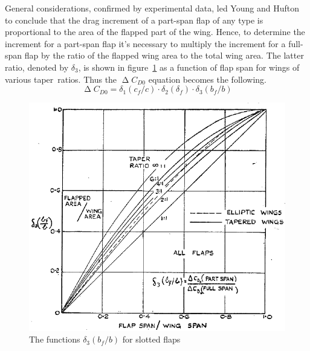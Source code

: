 \bigskip
\noindent
General considerations, confirmed by experimental data, led Young and Hufton to conclude that the drag increment of a part-span flap of any type is proportional to the area of the flapped part of the wing.
%
\noindent
Hence, to determine the increment for a part-span flap it's necessary to multiply the increment for a full-span flap by the ratio of the flapped wing area to the total wing area. The latter ratio, denoted by $\delta_3$, is shown in figure~\ref{fig:Delta3} as a function of flap span for wings of various taper~ratios. Thus the $\upDelta C_{D0}$ equation becomes the following.
%
\begin{equation}
\upDelta C_{D0}=\delta_1\left(c_f/c\right)\cdot\delta_2\left(\delta_f\right)\cdot\delta_3\left(b_f/b\right)
\label{eqn:DeltaCD0PartSpan}
\end{equation}
%
\begin{figure}[!b]
\centering
\includegraphics[width=0.8\linewidth]{Delta3}
\caption{The functions $\delta_3\left(b_f/b\right)$ for slotted flaps}
\label{fig:Delta3}
\end{figure}

